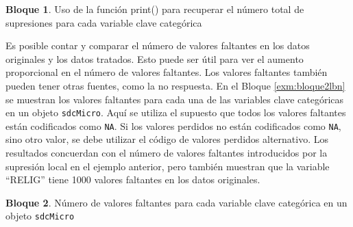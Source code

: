 \documentclass[]{book}
\newenvironment{Shaded}{\begin{snugshade}}{\end{snugshade}}
\newcommand{\CommentTok}[1]{\textcolor[rgb]{0.56,0.35,0.01}{\textit{#1}}}
\newcommand{\DataTypeTok}[1]{\textcolor[rgb]{0.13,0.29,0.53}{#1}}
\newcommand{\DecValTok}[1]{\textcolor[rgb]{0.00,0.00,0.81}{#1}}
\newcommand{\KeywordTok}[1]{\textcolor[rgb]{0.13,0.29,0.53}{\textbf{#1}}}
\newcommand{\NormalTok}[1]{#1}
\newcommand{\OtherTok}[1]{\textcolor[rgb]{0.56,0.35,0.01}{#1}}
\newcommand{\StringTok}[1]{\textcolor[rgb]{0.31,0.60,0.02}{#1}}
\theoremstyle{definition}
\theoremstyle{definition}
\newtheorem{example}{Bloque}[chapter]
\theoremstyle{definition}
\theoremstyle{definition}
\theoremstyle{remark}
\begin{document}
\begin{example}
\protect\hypertarget{exm:bloque1lbn}{}{\label{exm:bloque1lbn} }Uso de la función print() para recuperar el número total de supresiones para cada variable clave categórica
\end{example}

\begin{Shaded}
\end{Shaded}

Es posible contar y comparar el número de valores faltantes en los datos originales y los datos tratados. Esto puede ser útil para ver el aumento proporcional en el número de valores faltantes. Los valores faltantes
también pueden tener otras fuentes, como la no respuesta. En el Bloque \ref{exm:bloque2lbn} se muestran los valores faltantes para cada una de las variables clave categóricas en un objeto \texttt{sdcMicro}. Aquí se utiliza el supuesto que todos los valores faltantes están codificados como \texttt{NA}. Si los valores perdidos no están codificados como \texttt{NA}, sino otro valor, se debe utilizar el código de valores perdidos alternativo. Los resultados concuerdan con el número de valores faltantes introducidos por la supresión local en el ejemplo anterior, pero también muestran que la variable ``RELIG'' tiene 1000 valores faltantes en los datos originales.

\begin{example}
\protect\hypertarget{exm:bloque2lbn}{}{\label{exm:bloque2lbn} }Número de valores faltantes para cada variable clave categórica en un objeto \texttt{sdcMicro}
\end{example}
\end{document}
